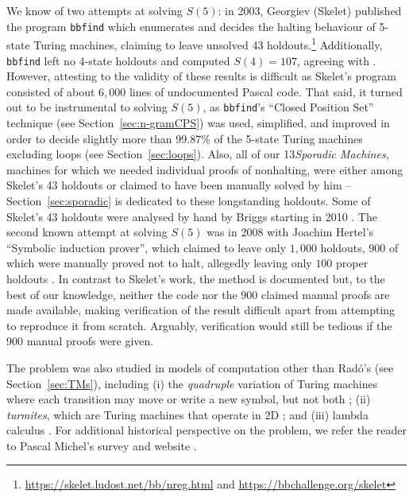 \documentclass[a4paper,british]{article}
\theoremstyle{definition} %
\numberwithin{equation}{section}
\theoremstyle{definition} %
\newcommand{\rado}{Rad\'o\xspace}
\newcommand{\numSporadic}{13\xspace}
\begin{document}
We know of two attempts at solving $S(5)$: in 2003, Georgiev (Skelet) published the program \texttt{bbfind} \cite{Skelet_bbfind} which enumerates and decides the halting behaviour of 5-state Turing machines, claiming to leave unsolved 43 holdouts.\footnote{\url{https://skelet.ludost.net/bb/nreg.html} and \url{https://bbchallenge.org/skelet}} Additionally, \texttt{bbfind} left no 4-state holdouts and computed $S(4) = 107$, agreeing with \cite{Brady83}. However, attesting to the validity of these results is difficult as Skelet's program consisted of about $6{,}000$ lines of undocumented Pascal code. That said, it turned out to be instrumental to solving $S(5)$, as \texttt{bbfind}'s ``Closed Position Set'' technique (see Section~\ref{sec:n-gramCPS}) was used, simplified, and improved in order to decide slightly more than 99.87\% of the 5-state Turing machines excluding loops (see Section~\ref{sec:loops}). Also, all of our \numSporadic \textit{Sporadic Machines}, \ie machines for which we needed individual proofs of nonhalting, were either among Skelet's 43 holdouts or claimed to have been manually solved by him -- Section~\ref{sec:sporadic} is dedicated to these longstanding holdouts. Some of Skelet's 43 holdouts were analysed by hand by Briggs starting in 2010 \cite{DanBriggs}. The second known attempt at solving $S(5)$ was in 2008 with Joachim Hertel's ``Symbolic induction prover'', which claimed to leave only $1{,}000$ holdouts, $900$ of which were manually proved not to halt, allegedly leaving only $100$ proper holdouts \cite{Hertel}. In contrast to Skelet's work, the method is documented but, to the best of our knowledge, neither the code nor the 900 claimed manual proofs are made available, making verification of the result difficult apart from attempting to reproduce it from scratch. Arguably, verification would still be tedious if the 900 manual proofs were given.

The \BBfull problem was also studied in models of computation other than \rado's (see Section~\ref{sec:TMs}), including (i) the \textit{quadruple} variation of Turing machines where each transition may move or write a new symbol, but not both \cite{Ross2003,Ross2005}; (ii) \textit{turmites}, which are Turing machines that operate in 2D \cite{BradyMeaningOfLife}; and (iii) lambda calculus \cite{tromp_oeis}. For additional historical perspective on the \BBfull problem, we refer the reader to Pascal Michel's survey and website \cite{michel2019busy,PMichel_website}.
\end{document}
